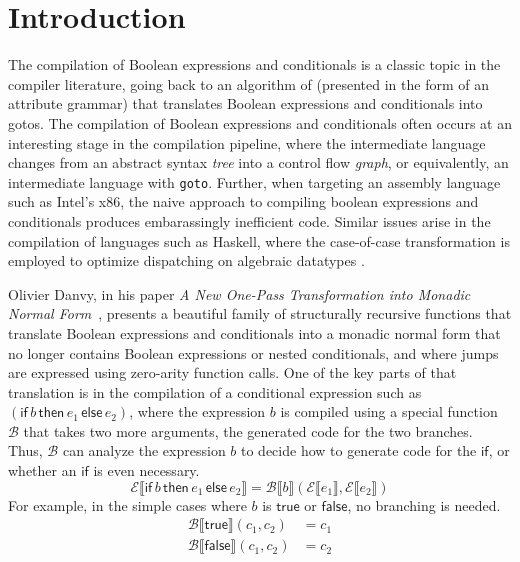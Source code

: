 \documentclass[sigplan,review,dvipsnames,screen,10pt]{acmart}
\newcommand{\TRUE}[0]{\mathsf{true}}
\newcommand{\FALSE}[0]{\mathsf{false}}
\newcommand{\IF}[3]{\mathsf{if}\,#1\,\mathsf{then}\,#2\,\mathsf{else}\,#3}
\newcommand{\CE}[1]{\mathcal{E} \llbracket #1 \rrbracket}
\newcommand{\CB}[3]{\mathcal{B} \llbracket #1 \rrbracket ( #2, #3 )}
\begin{document}

\maketitle

\section{Introduction}

The compilation of Boolean expressions and conditionals is a classic
topic in the compiler literature, going back to an algorithm of
\citet{Aho:1986qf} (presented in the form of an attribute grammar)
that translates Boolean expressions and conditionals into gotos. The
compilation of Boolean expressions and conditionals often occurs at an
interesting stage in the compilation pipeline, where the intermediate
language changes from an abstract syntax \emph{tree} into a control
flow \emph{graph}, or equivalently, an intermediate language with
\texttt{goto}. Further, when targeting an assembly language such as
Intel's x86, the naive approach to compiling boolean expressions and
conditionals produces embarassingly inefficient code. Similar issues
arise in the compilation of languages such as Haskell, where the
case-of-case transformation is employed to optimize dispatching on
algebraic datatypes \citep{PEYTONJONES19983}.

Olivier Danvy, in his paper \emph{A New One-Pass Transformation into
Monadic Normal Form}~\citep{Danvy:2003fk}, presents a beautiful family
of structurally recursive functions that translate Boolean expressions
and conditionals into a monadic normal form that no longer contains
Boolean expressions or nested conditionals, and where jumps are
expressed using zero-arity function calls. One of the key parts of
that translation is in the compilation of a conditional expression
such as $(\IF{b}{e_1}{e_2})$, where the expression $b$ is compiled
using a special function $\mathcal{B}$ that takes two more arguments,
the generated code for the two branches. Thus, $\mathcal{B}$ can
analyze the expression $b$ to decide how to generate code for the
$\mathsf{if}$, or whether an $\mathsf{if}$ is even necessary.
\[
\CE{\IF{b}{e_1}{e_2}} = \CB{b}{\CE{e_1}}{\CE{e_2}}
\]
For example, in the simple cases where $b$ is $\TRUE$ or $\FALSE$,
no branching is needed.
\begin{align*}
\CB{\TRUE}{c_1}{c_2} &= c_1 \\
\CB{\FALSE}{c_1}{c_2} &= c_2
\end{align*}
\end{document}
